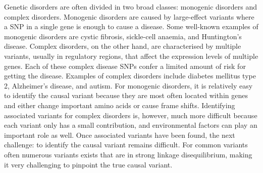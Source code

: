 Genetic disorders are often divided in two broad classes: monogenic disorders\cite{heidiRareGeneticDisorders2008} and complex disorders\cite{craigComplexDiseasesResearch2008}. Monogenic disorders are caused by large-effect variants where a SNP in a single gene is enough to cause a disease. Some well-known examples of monogenic disorders are cystic fibrosis\cite{keremIdentificationCysticFibrosis1989}, sickle-cell anaemia\cite{neelInheritanceSickleCell1949}, and Huntington's disease\cite{gusellaPolymorphicDNAMarker1983}. Complex disorders, on the other hand, are characterised by multiple variants, usually in regulatory regions, that affect the expression levels of multiple genes. Each of these complex disease SNPs confer a limited amount of risk for getting the disease. Examples of complex disorders include diabetes mellitus type 2\cite{americandiabetesassociationDiagnosisClassificationDiabetes2007}, Alzheimer's disease\cite{hardyAlzheimerDiseaseAmyloid1992}, and autism\cite{PolygenicTransmissionDisequilibrium}. For monogenic disorders, it is relatively easy to identify the causal variant because they are most often located within genes and either change important amino acids or cause frame shifts. Identifying associated variants for complex disorders is, however, much more difficult because each variant only has a small contribution, and environmental factors can play an important role as well. Once associated variants have been found, the next challenge: to identify the causal variant remains difficult. For common variants often numerous variants exists that are in strong linkage disequilibrium, making it very challenging to pinpoint the true causal variant.


